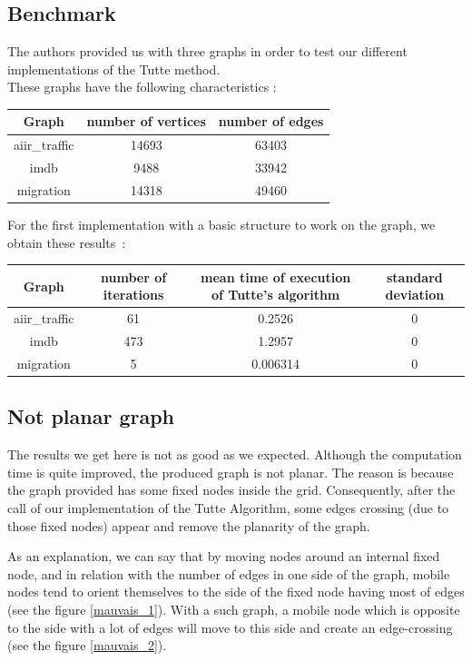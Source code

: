 \subsection{Benchmark}

The authors provided us with three graphs in order to test our
different implementations of the Tutte method.\\

These graphs have the following characteristics :

\begin{center}
\begin{tabular}{|c|c|c|}
\hline
Graph & number of vertices & number of edges \\
\hline
aiir\_traffic & 14693 & 63403\\
imdb & 9488 & 33942\\
migration & 14318 & 49460\\
\hline
\end{tabular}
\end{center}


For the first implementation with a basic structure to
work on the graph, we obtain these results~:

\begin{center}
\begin{tabular}{|c|c|c|c|}
\hline
Graph & number of iterations & mean time of execution of Tutte's algorithm & standard deviation\\
\hline
aiir\_traffic & 61 & 0.2526 & 0\\
imdb & 473 & 1.2957 & 0\\
migration & 5 & 0.006314 & 0\\
\hline

\end{tabular}
\end{center}

\subsection{Not planar graph}
The results we get here is not as good as we expected. Although the
computation time is quite improved, the produced graph is not planar.  The
reason is because the graph provided has some fixed nodes inside the
grid. Consequently, after the call of our implementation of the Tutte
Algorithm, some edges crossing (due to those fixed nodes) appear and remove
the planarity of the graph.

As an explanation, we can say that by moving nodes around an internal fixed
node, and in relation with the number of edges in one side of the graph, mobile
nodes tend to orient themselves to the side of the fixed node having
most of edges (see the figure \ref{mauvais_1}). With a such graph, a
mobile node which is opposite to the side with a lot of edges will move to
this side and create an edge-crossing (see the figure \ref{mauvais_2}).

